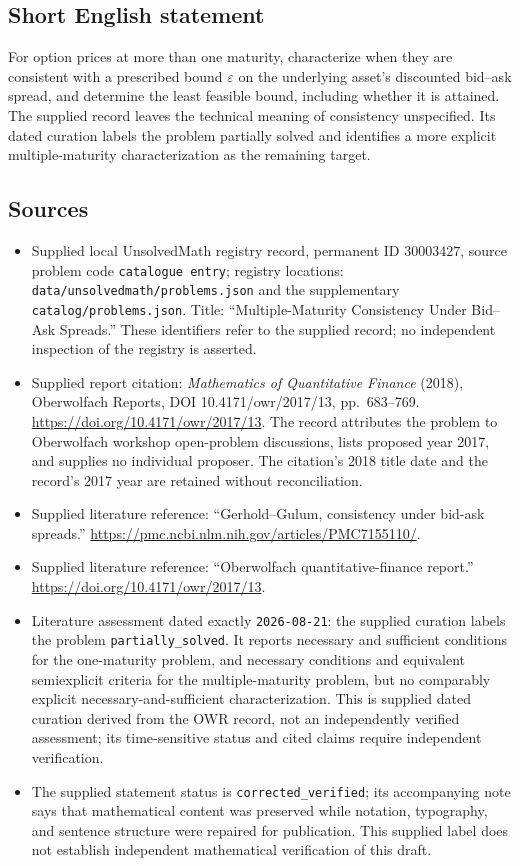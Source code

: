\documentclass[11pt]{article}
\begin{document}
\subsection{Short English statement}
For option prices at more than one maturity, characterize when they are consistent with a prescribed bound \(\varepsilon\) on the underlying asset's discounted bid--ask spread, and determine the least feasible bound, including whether it is attained. The supplied record leaves the technical meaning of consistency unspecified. Its dated curation labels the problem partially solved and identifies a more explicit multiple-maturity characterization as the remaining target.
\subsection{Sources}
\begin{itemize}
\item Supplied local UnsolvedMath registry record, permanent ID \(30003427\), source problem code \texttt{catalogue entry}; registry locations: \texttt{data/unsolvedmath/problems.json} and the supplementary \texttt{catalog/problems.json}. Title: ``Multiple-Maturity Consistency Under Bid--Ask Spreads.'' These identifiers refer to the supplied record; no independent inspection of the registry is asserted.
\item Supplied report citation: \emph{Mathematics of Quantitative Finance} (2018), Oberwolfach Reports, DOI 10.4171/owr/2017/13, pp.\ 683--769. \url{https://doi.org/10.4171/owr/2017/13}. The record attributes the problem to Oberwolfach workshop open-problem discussions, lists proposed year 2017, and supplies no individual proposer. The citation's 2018 title date and the record's 2017 year are retained without reconciliation.
\item Supplied literature reference: ``Gerhold--Gulum, consistency under bid-ask spreads.'' \url{https://pmc.ncbi.nlm.nih.gov/articles/PMC7155110/}.
\item Supplied literature reference: ``Oberwolfach quantitative-finance report.'' \url{https://doi.org/10.4171/owr/2017/13}.
\item Literature assessment dated exactly \texttt{2026-08-21}: the supplied curation labels the problem \texttt{partially\_solved}. It reports necessary and sufficient conditions for the one-maturity problem, and necessary conditions and equivalent semiexplicit criteria for the multiple-maturity problem, but no comparably explicit necessary-and-sufficient characterization. This is supplied dated curation derived from the OWR record, not an independently verified assessment; its time-sensitive status and cited claims require independent verification.
\item The supplied statement status is \texttt{corrected\_verified}; its accompanying note says that mathematical content was preserved while notation, typography, and sentence structure were repaired for publication. This supplied label does not establish independent mathematical verification of this draft.
\end{itemize}
\end{document}
